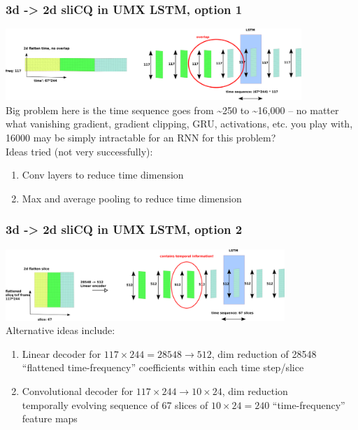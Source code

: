 \documentclass[usenames,dvipsnames]{beamer}
\begin{document}
\begin{frame}
	\frametitle{3d -> 2d sliCQ in UMX LSTM, option 1}
	\includegraphics[height=2.7cm]{./umxslicqlstm1.png}\\
	Big problem here is the time sequence goes from \textasciitilde 250 to \textasciitilde 16,000 -- no matter what vanishing gradient, gradient clipping, GRU, activations, etc. you play with, 16000 may be simply intractable for an RNN for this problem?\\
	Ideas tried (not very successfully):
	\begin{enumerate}
		\item
			Conv layers to reduce time dimension
		\item
			Max and average pooling to reduce time dimension
	\end{enumerate}
\end{frame}

\begin{frame}
	\frametitle{3d -> 2d sliCQ in UMX LSTM, option 2}
	\includegraphics[height=2.7cm]{./umxslicqlstm2.png}\\
	Alternative ideas include:
	\begin{enumerate}
		\item
			Linear decoder for $117 \times 244 = 28548 \rightarrow 512$, dim reduction of 28548 ``flattened time-frequency'' coefficients within each time step/slice
		\item
			Convolutional decoder for $117 \times 244 \rightarrow 10 \times 24$, dim reduction\\
			temporally evolving sequence of 67 slices of $10 \times 24 = 240$ ``time-frequency'' feature maps
	\end{enumerate}
\end{frame}
\end{document}
